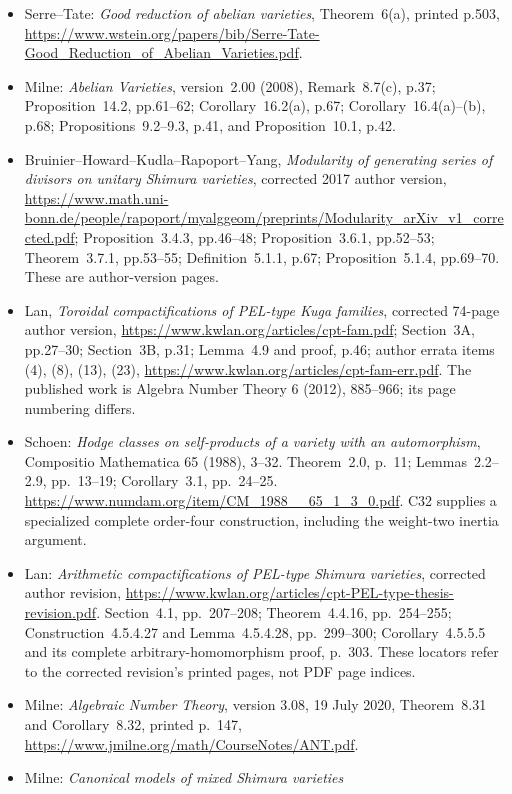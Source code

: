 \documentclass[11pt]{article}
\theoremstyle{definition}\newtheorem{definition}[theorem]{Definition}\newtheorem{remark}[theorem]{Remark}
\begin{document}
\begin{itemize}[leftmargin=*]
\item Serre--Tate: \emph{Good reduction of abelian varieties},
Theorem~6(a), printed p.503,
\url{https://www.wstein.org/papers/bib/Serre-Tate-Good_Reduction_of_Abelian_Varieties.pdf}.
\item Milne: \emph{Abelian Varieties}, version~2.00 (2008),
Remark~8.7(c), p.37; Proposition~14.2, pp.61--62;
Corollary~16.2(a), p.67; Corollary~16.4(a)--(b), p.68;
Propositions~9.2--9.3, p.41, and Proposition~10.1, p.42.
\item Bruinier--Howard--Kudla--Rapoport--Yang,
\emph{Modularity of generating series of divisors on unitary
Shimura varieties}, corrected 2017 author version,
\url{https://www.math.uni-bonn.de/people/rapoport/myalggeom/preprints/Modularity_arXiv_v1_corrected.pdf};
Proposition~3.4.3, pp.46--48; Proposition~3.6.1, pp.52--53;
Theorem~3.7.1, pp.53--55; Definition~5.1.1, p.67;
Proposition~5.1.4, pp.69--70. These are author-version pages.
\item Lan, \emph{Toroidal compactifications of PEL-type Kuga
families}, corrected 74-page author version,
\url{https://www.kwlan.org/articles/cpt-fam.pdf};
Section~3A, pp.27--30; Section~3B, p.31;
Lemma~4.9 and proof, p.46; author errata items (4), (8),
(13), (23), \url{https://www.kwlan.org/articles/cpt-fam-err.pdf}.
The published work is Algebra Number Theory 6 (2012),
885--966; its page numbering differs.
\item Schoen: \emph{Hodge classes on self-products of a variety
with an automorphism}, Compositio Mathematica 65 (1988),
3--32. Theorem~2.0, p.~11; Lemmas~2.2--2.9,
pp.~13--19; Corollary~3.1, pp.~24--25.
\url{https://www.numdam.org/item/CM_1988__65_1_3_0.pdf}.
C32 supplies a specialized complete order-four construction,
including the weight-two inertia argument.
\item Lan: \emph{Arithmetic compactifications of PEL-type
Shimura varieties}, corrected author revision,
\url{https://www.kwlan.org/articles/cpt-PEL-type-thesis-revision.pdf}.
Section~4.1, pp.~207--208; Theorem~4.4.16,
pp.~254--255; Construction~4.5.4.27 and
Lemma~4.5.4.28, pp.~299--300; Corollary~4.5.5.5
and its complete arbitrary-homomorphism proof, p.~303.
These locators refer to the corrected revision's printed
pages, not PDF page indices.
\item Milne: \emph{Algebraic Number Theory}, version 3.08,
19 July 2020, Theorem~8.31 and Corollary~8.32,
printed p.~147, \url{https://www.jmilne.org/math/CourseNotes/ANT.pdf}.
\item Milne: \emph{Canonical models of mixed Shimura varieties
}
\end{itemize}
\end{document}
